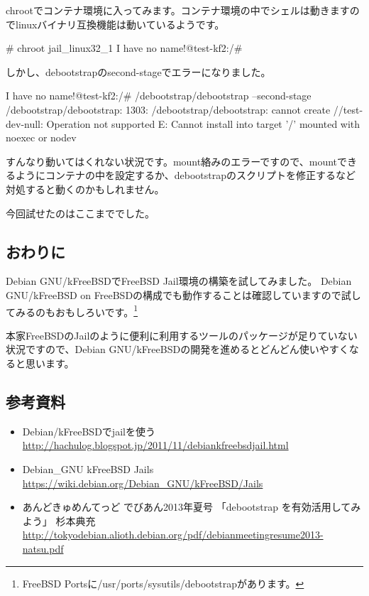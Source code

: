 \documentclass[mingoth,a4paper]{jsarticle}
\begin{document}
chrootでコンテナ環境に入ってみます。コンテナ環境の中でシェルは動きますのでlinuxバイナリ互換機能は動いているようです。

\begin{commandline}
# chroot jail_linux32_1
I have no name!@test-kf2:/# 
\end{commandline}

しかし、debootstrapのsecond-stageでエラーになりました。

\begin{commandline}
I have no name!@test-kf2:/# /debootstrap/debootstrap --second-stage
/debootstrap/debootstrap: 1303: /debootstrap/debootstrap: cannot create //test-dev-null: Operation not supported
E: Cannot install into target '/' mounted with noexec or nodev
\end{commandline}

すんなり動いてはくれない状況です。mount絡みのエラーですので、mountできるようにコンテナの中を設定するか、debootstrapのスクリプトを修正するなど対処すると動くのかもしれません。

今回試せたのはここまででした。

\subsection{おわりに}

Debian GNU/kFreeBSDでFreeBSD Jail環境の構築を試してみました。
Debian GNU/kFreeBSD on FreeBSDの構成でも動作することは確認していますので試してみるのもおもしろいです。\footnote{FreeBSD Portsに/usr/ports/sysutils/debootstrapがあります。}

本家FreeBSDのJailのように便利に利用するツールのパッケージが足りていない状況ですので、Debian GNU/kFreeBSDの開発を進めるとどんどん使いやすくなると思います。

\subsection{参考資料}
\begin{itemize}
  \item Debian/kFreeBSDでjailを使う \url{http://hachulog.blogspot.jp/2011/11/debiankfreebsdjail.html}
  \item Debian\_GNU kFreeBSD Jails  \url{https://wiki.debian.org/Debian\_GNU/kFreeBSD/Jails}
  \item あんどきゅめんてっど でびあん2013年夏号 「debootstrap を有効活用してみよう」 杉本典充 \url{http://tokyodebian.alioth.debian.org/pdf/debianmeetingresume2013-natsu.pdf}
\end{itemize}
\end{document}
